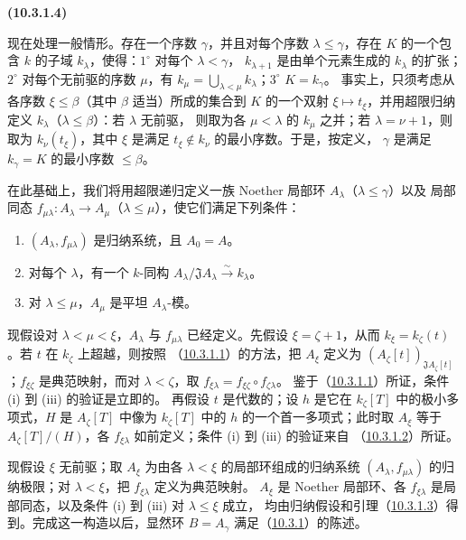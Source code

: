 \documentclass[UTF8,fontset=none,11pt,oneside,openany]{ctexbook}
\newenvironment{env}[1][]{%
  \par\medskip\noindent\textbf{(#1)}\ %
}{\par}
\newcommand{\oldpage}[2][]{%
  \hypertarget{ega-source-page-#1-#2}{}%
  \marginnote{\scriptsize\textbf{#1}~|~#2}\ignorespaces}
\let\EGAOriginalLabel\label
\renewcommand{\label}[1]{\phantomsection\EGAOriginalLabel{#1}}
\begin{document}
\begin{env}[10.3.1.4]
\label{0.10.3.1.4-fr}
现在处理一般情形。存在一个序数 $\gamma$，并且对每个序数 $\lambda\leq\gamma$，存在 $K$
的一个包含 $k$ 的子域 $k_\lambda$，使得：$1^\circ$ 对每个 $\lambda<\gamma$，
$k_{\lambda+1}$ 是由单个元素生成的 $k_\lambda$ 的扩张；$2^\circ$ 对每个无前驱的序数
$\mu$，有 $k_\mu=\bigcup_{\lambda<\mu}k_\lambda$；$3^\circ$ $K=k_\gamma$。
事实上，只须考虑从各序数 $\xi\leq\beta$（其中 $\beta$ 适当）所成的集合到 $K$ 的一个双射
$\xi\mapsto t_\xi$，并用超限归纳定义 $k_\lambda$（$\lambda\leq\beta$）：若 $\lambda$ 无前驱，
则取为各 $\mu<\lambda$ 的 $k_\mu$ 之并；若 $\lambda=\nu+1$，则取为
$k_\nu(t_\xi)$，其中 $\xi$ 是满足 $t_\xi\notin k_\nu$ 的最小序数。于是，按定义，
$\gamma$ 是满足 $k_\gamma=K$ 的最小序数 $\leq\beta$。

在此基础上，我们将用超限递归定义一族 Noether 局部环 $A_\lambda$（$\lambda\leq\gamma$）以及
局部同态 $f_{\mu\lambda}:A_\lambda\to A_\mu$（$\lambda\leq\mu$），使它们满足下列条件：
\begin{enumerate}
  \item[(i)] $(A_\lambda,f_{\mu\lambda})$ 是归纳系统，且 $A_0=A$。
  \item[(ii)] 对每个 $\lambda$，有一个 $k$-同构
    $A_\lambda/\mathfrak J A_\lambda\xrightarrow{\sim}k_\lambda$。
  \item[(iii)] 对 $\lambda\leq\mu$，$A_\mu$ 是平坦 $A_\lambda$-模。
\end{enumerate}

现假设对 $\lambda<\mu<\xi$，$A_\lambda$ 与 $f_{\mu\lambda}$ 已经定义。先假设
$\xi=\zeta+1$，从而 $k_\xi=k_\zeta(t)$。若 $t$ 在 $k_\zeta$ 上超越，则按照
（\hyperref[0.10.3.1.1-fr]{10.3.1.1}）的方法，把 $A_\xi$ 定义为
$(A_\zeta[t])_{\mathfrak J A_\zeta[t]}$；$f_{\xi\zeta}$ 是典范映射，而对
$\lambda<\zeta$，取 $f_{\xi\lambda}=f_{\xi\zeta}\circ f_{\zeta\lambda}$。
鉴于（\hyperref[0.10.3.1.1-fr]{10.3.1.1}）所证，条件 (i) 到 (iii) 的验证是立即的。
再假设 $t$ 是代数的；设 $h$ 是它在 $k_\zeta[T]$ 中的极小多项式，$H$ 是
$A_\zeta[T]$ 中像为 $k_\zeta[T]$ 中的 $h$ 的一个首一多项式；此时取 $A_\xi$
等于 $A_\zeta[T]/(H)$，各 $f_{\xi\lambda}$ 如前定义；条件 (i) 到 (iii) 的验证来自
（\hyperref[0.10.3.1.2-fr]{10.3.1.2}）所证。

现假设 $\xi$ 无前驱；取 $A_\xi$ 为由各 $\lambda<\xi$ 的局部环组成的归纳系统
$(A_\lambda,f_{\mu\lambda})$ 的归纳极限；对 $\lambda<\xi$，把 $f_{\xi\lambda}$ 定义为典范映射。
$A_\xi$ 是 Noether 局部环、各 $f_{\xi\lambda}$ 是局部同态，以及条件 (i) 到 (iii) 对
$\lambda\leq\xi$ 成立，
\oldpage[0\textsubscript{III}]{23}
均由归纳假设和引理（\hyperref[0.10.3.1.3-fr]{10.3.1.3}）得到。完成这一构造以后，显然环
$B=A_\gamma$ 满足（\hyperref[0.10.3.1-fr]{10.3.1}）的陈述。
\end{env}
\end{document}
